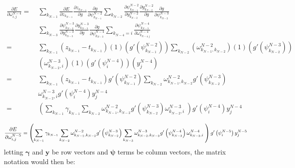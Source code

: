 \documentclass{article}
\begin{document}
\begin{equation} \label{eq:derive_du_nm4}
\begin{aligned}
\frac{\partial E}{\partial \omega_{i,j}^{N-4}} =& \;
%
\sum_{k_{N-1}}
\frac{\partial E}{\partial z_{k_{N-1}}}
\frac{\partial z_{k_{N-1}}}{\partial g}
\frac{\partial g}{\partial \psi_{k_{N-1}}^{N-2}}
%
\sum_{k_{N-2}}
\frac{\partial \psi_{k_{N-1}}^{N-2}}{\partial y_{k_{N-2}}^{N-2}}
\frac{\partial y_{k_{N-2}}^{N-2}}{\partial g}
\frac{\partial g}{\partial \psi_{k_{N-2}}^{N-3}} \\
%
& \;\sum_{k_{N-3}}
\frac{\partial \psi_{k_{N-2}}^{N-3}}{\partial y_{k_{N-3}}^{N-3}}
\frac{\partial y_{k_{N-3}}^{N-3}}{\partial g}
\frac{\partial g}{\partial \psi_{k_{N-3}}^{N-4}}
%
\sum_{k_{N-4}=i}
\frac{\partial \psi_{k_{N-3}}^{N-4}}{\partial \omega_{k_{N-4,j}}^{N-4}} \\
=& \; \sum_{k_{N-1}}
\left( z_{k_{N-1}} - t_{k_{N-1}} \right)
%
(1)
\left( g' \left( \psi_{k_{N-1}}^{N-2} \right) \right)
%
\sum_{k_{N-2}}
\left( \omega_{k_{N-1},k_{N-2}}^{N-2} \right)
(1)
\left( g' (\psi_{k_{N-2}}^{N-3}) \right) \\
%
& \; \left( \omega_{k_{N-2},i}^{N-3} \right)
(1)
\left( g' (\psi_i^{N-4}) \right)
%
\left( y_j^{N-4} \right) \\
=& \;
\sum_{k_{N-1}}
\left( z_{k_{N-1}} - t_{k_{N-1}} \right)
g' \left( \psi_{k_{N-1}}^{N-2} \right)
%
\sum_{k_{N-2}}
\omega_{k_{N-1},k_{N-2}}^{N-2}
g' \left( \psi_{k_{N-2}}^{N-3} \right) \\
%
& \; \omega_{k_{N-2},i}^{N-3}
g' \left( \psi_i^{N-4} \right)
y_j^{N-4} \\
=& \;
\left(
\sum_{k_{N-1}}
\gamma_{k_{N-1}}
%
\sum_{k_{N-2}}
\omega_{k_{N-1},k_{N-2}}^{N-2}
g' \left( \psi_{k_{N-2}}^{N-3} \right)
%
\omega_{k_{N-2},i}^{N-3} \;
\right)
g' \left( \psi_i^{N-4} \right)
y_j^{N-4} \\
\end{aligned}
\end{equation}
%
\begin{equation} \label{eq:derive_du_nm5}
\frac{\partial E}{\partial \omega_{i,j}^{N-5}} =
\left(
\sum_{k_{N-1}}
\gamma_{k_{N-1}}
%
\sum_{k_{N-2}}
\omega_{k_{N-1},k_{N-2}}^{N-2}
g' \left( \psi_{k_{N-2}}^{N-3} \right)
%
\sum_{k_{N-3}}
\omega_{k_{N-2},k_{N-3}}^{N-3}
g' \left( \psi_{k_{N-3}}^{N-4} \right)
%
\omega_{k_{N-3},i}^{N-4} \;
\right)
g' \left( \psi_i^{N-5} \right)
y_j^{N-5} \\
%
\end{equation}
%
letting $\bm{\gamma}$ and $\bm{y}$ be row vectors and $\bm{\psi}$ terms be column vectors, the matrix notation would then be:
\end{document}
